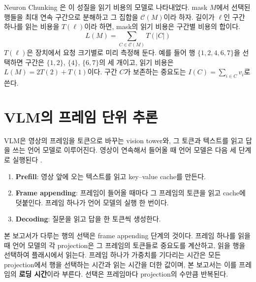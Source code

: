 Neuron Chunking \cite{yang2025}은 이 성질을 읽기 비용의 모델로 나타내었다. mask $M$에서 선택된 행들을 최대 연속 구간으로 분해하고 그 집합을 $\mathcal C(M)$이라 하자. 길이가 $\ell$인 구간 하나를 읽는 비용을 $T(\ell)$이라 하면, mask의 읽기 비용은 구간별 비용의 합이다.
\[
L(M)=\sum_{C\in\mathcal C(M)}T(|C|)
\]
$T(\ell)$은 장치에서 요청 크기별로 미리 측정해 둔다. 예를 들어 행 $\{1,2,4,6,7\}$을 선택하면 구간은 $\{1,2\}$, $\{4\}$, $\{6,7\}$의 세 개이고, 읽기 비용은 $L(M)=2T(2)+T(1)$이다. 구간 $C$가 보존하는 중요도는 $I(C)=\sum_{i\in C}v_i$로 쓴다.

\section{VLM의 프레임 단위 추론}\label{sec:frame-appending}

VLM은 영상의 프레임을 토큰으로 바꾸는 vision tower와, 그 토큰과 텍스트를 읽고 답을 쓰는 언어 모델로 이루어진다. 영상이 연속해서 들어올 때 언어 모델은 다음 세 단계로 실행된다 \cite{yang2025}.

\begin{enumerate}
\item \textbf{Prefill}: 영상 앞에 오는 텍스트를 읽고 key--value cache를 만든다.
\item \textbf{Frame appending}: 프레임이 들어올 때마다 그 프레임의 토큰을 읽고 cache에 덧붙인다. 프레임 하나가 언어 모델의 실행 한 번이다.
\item \textbf{Decoding}: 질문을 읽고 답을 한 토큰씩 생성한다.
\end{enumerate}

본 보고서가 다루는 행의 선택은 frame appending 단계의 것이다. 프레임 하나를 읽을 때 언어 모델의 각 projection은 그 프레임의 토큰들로 중요도를 계산하고, 읽을 행을 선택하여 플래시에서 읽는다. 프레임 하나가 가중치를 기다리는 시간은 모든 projection에서 행을 선택하는 시간과 읽는 시간을 더한 값이며, 본 보고서는 이를 프레임의 \textbf{로딩 시간}이라 부른다. 선택은 프레임마다 projection의 수만큼 반복된다.
